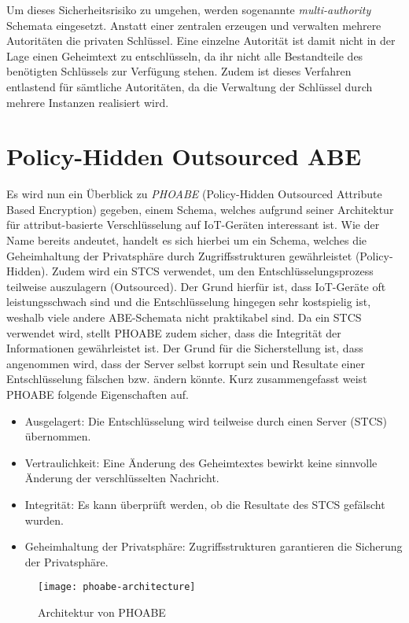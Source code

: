 \documentclass{hsflensburg}
\begin{document}
	Um dieses Sicherheitsrisiko zu umgehen, werden sogenannte
	\textit{multi-authority} Schemata eingesetzt. Anstatt einer zentralen erzeugen
	und verwalten mehrere Autoritäten die privaten Schlüssel. Eine einzelne
	Autorität ist damit nicht in der Lage einen Geheimtext zu entschlüsseln, da
	ihr nicht alle Bestandteile des benötigten Schlüssels zur Verfügung stehen.
	Zudem ist dieses Verfahren entlastend für sämtliche Autoritäten, da die
	Verwaltung der Schlüssel durch mehrere Instanzen realisiert wird.

	\section{Policy-Hidden Outsourced ABE}
	Es wird nun ein Überblick zu \textit{PHOABE} (Policy-Hidden Outsourced
	Attribute Based Encryption) gegeben, einem Schema, welches aufgrund seiner
	Architektur für attribut-basierte Verschlüsselung auf IoT-Geräten interessant
	ist. Wie der Name bereits andeutet, handelt es sich hierbei um ein Schema,
	welches die Geheimhaltung der Privatsphäre durch Zugriffsstrukturen gewährleistet
	(Policy-Hidden). Zudem wird ein STCS verwendet, um den Entschlüsselungsprozess
	teilweise auszulagern (Outsourced). Der Grund hierfür ist, dass IoT-Geräte oft
	leistungsschwach sind und die Entschlüsselung hingegen sehr kostspielig ist,
	weshalb viele andere ABE-Schemata nicht praktikabel sind. Da ein STCS
	verwendet wird, stellt PHOABE zudem sicher, dass die Integrität der
	Informationen gewährleistet ist. Der Grund für die Sicherstellung ist, dass
	angenommen wird, dass der Server selbst korrupt sein und Resultate einer
	Entschlüsselung fälschen bzw. ändern könnte. Kurz zusammengefasst weist PHOABE
	folgende Eigenschaften auf.

	\begin{itemize}
		\item Ausgelagert: Die Entschlüsselung wird teilweise durch einen Server
			(STCS) übernommen.
		\item Vertraulichkeit: Eine Änderung des Geheimtextes bewirkt keine
			sinnvolle Änderung der verschlüsselten Nachricht.
		\item Integrität: Es kann überprüft werden, ob die Resultate des STCS
			ge\-fälscht wurden.
		\item Geheimhaltung der Privatsphäre: Zugriffsstrukturen garantieren die
			Sicherung der Privatsphäre.
	\end{itemize}

	\begin{figure}
		\centering
		\texttt{[image: phoabe-architecture]}
		\caption{Architektur von PHOABE \cite{phoabe}}
	\end{figure}
\end{document}
